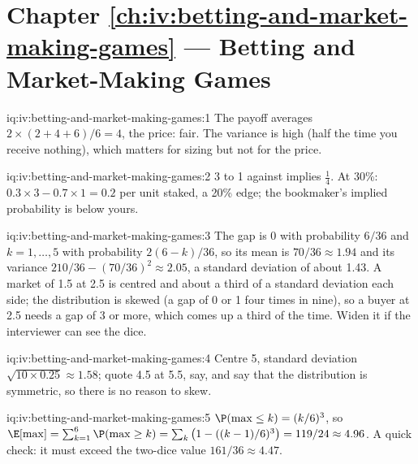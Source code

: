 \section*{Chapter \ref{ch:iv:betting-and-market-making-games} --- Betting and Market-Making Games}

\begin{solution}{iq:iv:betting-and-market-making-games:1}
The payoff averages $2 \times (2 + 4 + 6)/6 = 4$, the price: fair. The variance is high (half the time you receive
nothing), which matters for sizing but not for the price.
\end{solution}

\begin{solution}{iq:iv:betting-and-market-making-games:2}
3 to 1 against implies $\tfrac14$. At 30\%: $0.3 \times 3 - 0.7 \times 1 = 0.2$ per unit staked, a 20\% edge; the
bookmaker's implied probability is below yours.
\end{solution}

\begin{solution}{iq:iv:betting-and-market-making-games:3}
The gap is 0 with probability $6/36$ and $k = 1, \dots, 5$ with probability $2(6-k)/36$, so its mean is $70/36 \approx
1.94$ and its variance $210/36 - (70/36)^2 \approx 2.05$, a standard deviation of about 1.43. A market of 1.5 at 2.5 is
centred and about a third of a standard deviation each side; the distribution is skewed (a gap of 0 or 1 four times in nine),
so a buyer at 2.5 needs a gap of 3 or more, which comes up a third of the time. Widen it if the interviewer can see the
dice.
\end{solution}

\begin{solution}{iq:iv:betting-and-market-making-games:4}
Centre 5, standard deviation $\sqrt{10 \times 0.25} \approx 1.58$; quote 4.5 at 5.5, say, and say that the
distribution is symmetric, so there is no reason to skew.
\end{solution}

\begin{solution}{iq:iv:betting-and-market-making-games:5}
$\P(\max \le k) = (k/6)^3$, so $\E[\max] = \sum_{k=1}^6 \P(\max \ge k) = \sum_k \big(1 - ((k-1)/6)^3\big) =
119/24 \approx 4.96$. A quick check: it must exceed the two-dice value $161/36 \approx 4.47$.
\end{solution}

